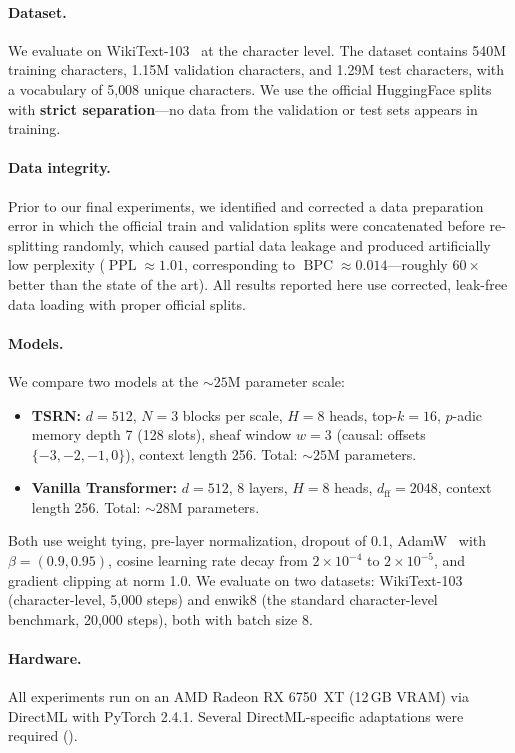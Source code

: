 \documentclass[11pt,a4paper]{article}
\DeclareMathOperator{\BPC}{BPC}
\DeclareMathOperator{\PPL}{PPL}
\begin{document}
\paragraph{Dataset.}
We evaluate on WikiText-103~\citep{merity2017pointer} at the
character level.  The dataset contains 540M training characters,
1.15M validation characters, and 1.29M test characters, with a
vocabulary of 5{,}008 unique characters.  We use the official
HuggingFace splits with \textbf{strict separation}---no data from the
validation or test sets appears in training.

\paragraph{Data integrity.}
Prior to our final experiments, we identified and corrected a data
preparation error in which the official train and validation splits
were concatenated before re-splitting randomly, which caused partial
data leakage and produced artificially low perplexity ($\PPL \approx
1.01$, corresponding to $\BPC \approx 0.014$---roughly $60\times$
better than the state of the art).  All results reported here use
corrected, leak-free data loading with proper official splits.

\paragraph{Models.}
We compare two models at the $\sim\!25$M parameter scale:
\begin{itemize}[leftmargin=*,nosep]
\item \textbf{TSRN:} $d{=}512$, $N{=}3$ blocks per scale,
  $H{=}8$ heads, top-$k{=}16$, $p$-adic memory depth 7 (128 slots),
  sheaf window $w{=}3$ (causal: offsets $\{-3,-2,-1,0\}$),
  context length 256.  Total: $\sim\!25$M parameters.
\item \textbf{Vanilla Transformer:} $d{=}512$, 8 layers,
  $H{=}8$ heads, $d_{\text{ff}}{=}2048$, context length 256.
  Total: $\sim\!28$M parameters.
\end{itemize}
Both use weight tying, pre-layer normalization, dropout of 0.1,
AdamW~\citep{loshchilov2019decoupled} with $\beta = (0.9, 0.95)$,
cosine learning rate decay from $2 \times 10^{-4}$ to
$2 \times 10^{-5}$, and gradient clipping at norm 1.0.
We evaluate on two datasets: WikiText-103 (character-level, 5{,}000
steps) and enwik8 (the standard character-level benchmark, 20{,}000
steps), both with batch size 8.

\paragraph{Hardware.}
All experiments run on an AMD Radeon RX 6750~XT (12\,GB VRAM) via
DirectML with PyTorch 2.4.1.  Several DirectML-specific adaptations
were required ().
\end{document}
